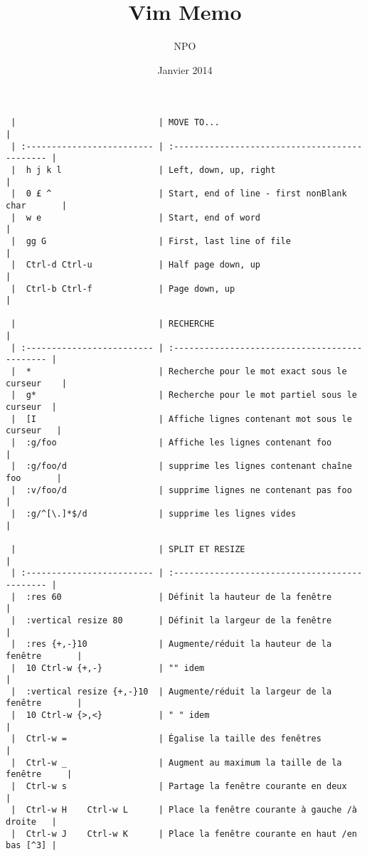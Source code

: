 \documentclass[10pt,landscape]{article}
\title{Vim Memo}
\author{NPO}
\date{Janvier 2014}
\begin{document}

\begin{multicols}{2}
\begin{verbatim}
 |                            | MOVE TO...                                     |
 | :------------------------- | :--------------------------------------------- |
 |  h j k l                   | Left, down, up, right                          |
 |  0 £ ^                     | Start, end of line - first nonBlank char       |
 |  w e                       | Start, end of word                             |
 |  gg G                      | First, last line of file                       |
 |  Ctrl-d Ctrl-u             | Half page down, up                             |
 |  Ctrl-b Ctrl-f             | Page down, up                                  |

 |                            | RECHERCHE                                      |
 | :------------------------- | :--------------------------------------------- |
 |  *                         | Recherche pour le mot exact sous le curseur    |
 |  g*                        | Recherche pour le mot partiel sous le curseur  |
 |  [I                        | Affiche lignes contenant mot sous le curseur   |
 |  :g/foo                    | Affiche les lignes contenant foo               |
 |  :g/foo/d                  | supprime les lignes contenant chaîne foo       |
 |  :v/foo/d                  | supprime lignes ne contenant pas foo           |
 |  :g/^[\.]*$/d              | supprime les lignes vides                      |

 |                            | SPLIT ET RESIZE                                |
 | :------------------------- | :--------------------------------------------- |
 |  :res 60                   | Définit la hauteur de la fenêtre               |
 |  :vertical resize 80       | Définit la largeur de la fenêtre               |
 |  :res {+,-}10              | Augmente/réduit la hauteur de la fenêtre       |
 |  10 Ctrl-w {+,-}           | "" idem                                        |
 |  :vertical resize {+,-}10  | Augmente/réduit la largeur de la fenêtre       |
 |  10 Ctrl-w {>,<}           | " " idem                                       |
 |  Ctrl-w =                  | Égalise la taille des fenêtres                 |
 |  Ctrl-w _                  | Augment au maximum la taille de la fenêtre     |
 |  Ctrl-w s                  | Partage la fenêtre courante en deux            |
 |  Ctrl-w H    Ctrl-w L      | Place la fenêtre courante à gauche /à droite   |
 |  Ctrl-w J    Ctrl-w K      | Place la fenêtre courante en haut /en bas [^3] |


\end{verbatim}
\end{multicols}
\end{document}
